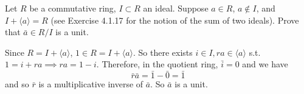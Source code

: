   \begin{exercise}[Shifrin 4.2.12]
    Let $R$ be a commutative ring, $I \subset R$ an ideal. Suppose $a \in R$, $a \notin I$, and $I + \langle a \rangle = R$ (see Exercise 4.1.17 for the notion of the sum of two ideals). Prove that $\bar{a} \in R/I$ is a unit.
  \end{exercise}
  \begin{solution}
    Since $R = I + \langle a \rangle$, $1 \in R = I + \langle a \rangle$. So there exists $i \in I, ra \in \langle a \rangle$ s.t. $1 = i + ra \implies ra = 1 - i$. Therefore, in the quotient ring, $\bar{i} = 0$ and we have 
    \begin{equation}
      \bar{r} \bar{a} = \bar{1} - \bar{0} = \bar{1}
    \end{equation}
    and so $\bar{r}$ is a multiplicative inverse of $\bar{a}$. So $\bar{a}$ is a unit. 
  \end{solution}

